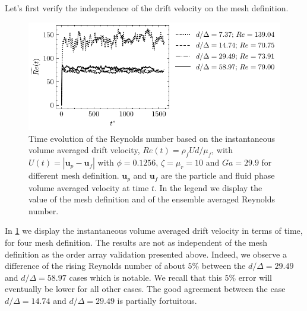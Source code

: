 Let's first verify the independence of the drift velocity on the mesh definition. 
\begin{figure}[h!]
    \centering
    \includegraphics[height = 0.3\textwidth]{image/HOMOGENEOUS_NEW/VAL/Re.pdf}
    \caption{
        Time evolution of the Reynolds number based on the instantaneous volume averaged drift velocity, $Re(t) = \rho_fU d /\mu_f$, with $U(t) = |\textbf{u}_p - \textbf{u}_f|$ with $\phi = 0.1256$, $\zeta =\mu_r =10$ and $Ga = 29.9$ for different mesh definition.
        $\textbf{u}_p$ and $\textbf{u}_f$ are the particle and fluid phase volume averaged velocity at time $t$.
        In the legend we display the value of the mesh definition and of the ensemble averaged Reynolds number. 
    }
    \label{fig:Re}
\end{figure}
In \ref{fig:Re} we display the instantaneous volume averaged drift velocity in terms of time, for four mesh definition. 
The results are not as independent of the mesh definition as the order array validation presented above. 
Indeed, we observe a difference of the rising Reynolds number of about $5\%$ between the $d/\Delta = 29.49$ and $d/\Delta = 58.97$ cases which is notable.
We recall that this $5\%$ error will eventually be lower for all other cases. 
The good agreement between the case  $d/\Delta = 14.74$ and $d/\Delta = 29.49$ is partially fortuitous.

